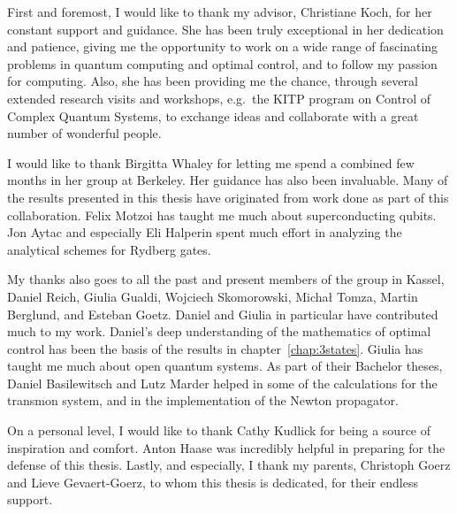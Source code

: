 
First and foremost, I would like to thank my advisor, Christiane Koch, for her
constant support and guidance. She has been truly exceptional in her dedication
and patience, giving me the opportunity to work on a wide range of fascinating
problems in quantum computing and optimal control, and to follow my passion for
computing. Also, she has been providing me the chance, through
several extended research visits and workshops, e.g.\ the KITP program on
Control of Complex Quantum Systems, to exchange ideas and collaborate
with a great number of wonderful people.

I would like to thank Birgitta Whaley for letting me spend a combined
few months in her group at Berkeley. Her guidance has also been
invaluable. Many of the results presented in
this thesis have originated from work done as part of this collaboration.
Felix Motzoi has taught me much about superconducting qubits.
Jon Aytac and especially Eli Halperin spent much effort in analyzing the
analytical schemes for Rydberg gates.

My thanks also goes to all the past and present members of the group in Kassel,
Daniel Reich, Giulia Gualdi, Wojciech Skomorowski, Michał Tomza, Martin
Berglund, and Esteban Goetz. Daniel and Giulia in particular have contributed
much to my work. Daniel's deep understanding of the mathematics of optimal
control has been the basis of the results in chapter~\ref{chap:3states}.
Giulia has taught me much about open quantum systems.
As part of their Bachelor theses, Daniel Basilewitsch and Lutz Marder helped in
some of the calculations for the transmon system, and in the implementation of
the Newton propagator.

On a personal level, I would like to thank Cathy Kudlick for being a source of
inspiration and comfort. Anton Haase was incredibly helpful in preparing for the
defense of this thesis. Lastly, and especially, I thank my parents, Christoph
Goerz and Lieve Gevaert-Goerz, to whom this thesis is dedicated, for their
endless support.
